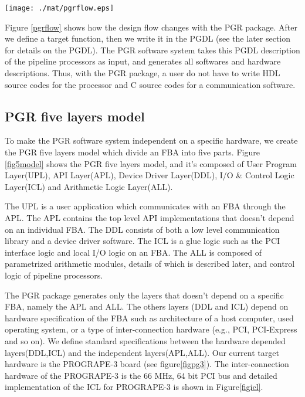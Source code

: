 \documentclass{llncs}
\begin{document}
\begin{figure*}[htb]
\begin{center}
\texttt{[image: ./mat/pgrflow.eps]}
\caption{How the design flow changes with PGR.}
\label{pgrflow}
\end{center}
\end{figure*}

Figure \ref{pgrflow} shows how the design flow changes with the PGR package.
After we define a target function, then we write it in the PGDL
(see the later section for details on the PGDL).
The PGR software system takes this PGDL description of the pipeline processors
as input, and generates all softwares and hardware descriptions.
Thus, with the PGR package, a user do not have to write HDL source codes for
the processor and C source codes for a communication software.

\subsection{PGR five layers model}
To make the PGR software system independent on a specific hardware,
we create the PGR five layers model which divide 
an FBA into five parts.
Figure \ref{fig5model} shows the PGR five layers model, 
and it's composed of User Program Layer(UPL), API Layer(APL),
Device Driver Layer(DDL), I/O \& Control Logic Layer(ICL) and
Arithmetic Logic Layer(ALL).

The UPL is a user application which communicates
with an FBA through the APL.
The APL contains the top level API implementations that
doesn't depend on an individual FBA.
The DDL consists of both a low level communication library and a device driver software. 
The ICL is a glue logic such as the PCI interface logic and 
local I/O logic on an FBA.
The ALL is composed of parametrized arithmetic modules,
details of which is described later, 
and control logic of pipeline processors.

The PGR package generates only the layers that doesn't depend on 
a specific FBA, namely the APL and ALL.
The others layers (DDL and ICL) depend on hardware specification
of the FBA such as architecture of a host computer, used operating
system, or a type of inter-connection hardware (e.g., PCI, PCI-Express and so on).
We define standard specifications between the hardware depended layers(DDL,ICL)
and the independent layers(APL,ALL).
Our current target hardware is the PROGRAPE-3 board (see figure\ref{figpg3}).
The inter-connection hardware of the PROGRAPE-3 is the 66 MHz, 64 bit PCI bus
and detailed implementation of the ICL for PROGRAPE-3
is shown in Figure\ref{figicl}.
\end{document}
